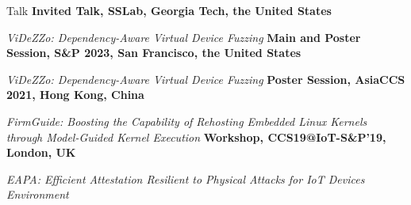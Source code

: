 \begin{rubric}{Talk}
\entry*[September 2023] 
    \textbf{Invited Talk, SSLab, Georgia Tech, the United States}
    \par \emph{ViDeZZo: Dependency-Aware Virtual Device Fuzzing}
\entry*[May 2023] 
    \textbf{Main and Poster Session, S\&P 2023, San Francisco, the United States}
    \par \emph{ViDeZZo: Dependency-Aware Virtual Device Fuzzing}
\entry*[June 2021] 
    \textbf{Poster Session, AsiaCCS 2021, Hong Kong, China}
    \par \emph{FirmGuide: Boosting the Capability of Rehosting Embedded
Linux Kernels through Model-Guided Kernel Execution}
\entry*[November 2019] 
    \textbf{Workshop, CCS19@IoT-S\&P’19, London, UK}
    \par \emph{EAPA: Efficient Attestation Resilient to Physical Attacks for IoT Devices Environment}
\end{rubric}